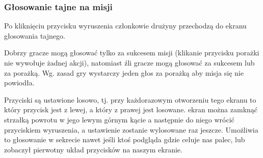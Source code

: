 \documentclass[12pt]{article}
\begin{document}
\subsubsection{Głosowanie tajne na misji}
Po kliknięciu przycisku wyruszenia członkowie drużyny przechodzą do ekranu głosowania tajnego. 
\begin{figure}[!htb]
    \centering
    \centering
\end{figure}

Dobrzy gracze mogą głosować tylko za sukcesem misji (klikanie przycisku porażki nie wywołuje żadnej akcji), natomiast źli gracze mogą głosować za sukcesem lub za porażką. Wg. zasad gry wystarczy jeden głos za porażką aby misja się nie powiodła.

Przyciski są ustawione losowo, tj. przy każdorazowym otworzeniu tego ekranu to który przycisk jest z lewej, a który z prawej jest losowane. ekran można zamknąć strzałką powrotu w jego lewym górnym kącie a następnie do niego wrócić przyciskiem wyruszenia, a ustawienie zostanie wylosowane raz jeszcze. Umożliwia to głosowanie w sekrecie nawet jeśli ktoś podgląda gdzie celuje nas palec, lub zobaczył pierwotny układ przycisków na naszym ekranie.
\end{document}
